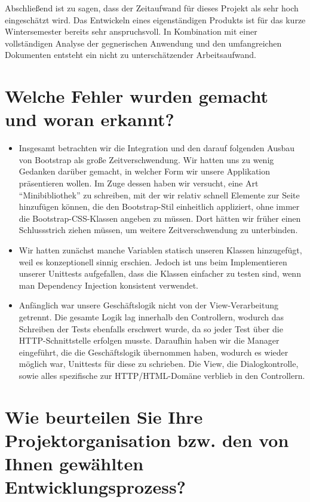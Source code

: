 \documentclass[12pt,DIV14,BCOR10mm,a4paper,parskip=half-,headsepline,headinclude,english,ngerman,bibliography=totocnumbered]{scrreprt}
\begin{document}
Abschließend ist zu sagen, dass der Zeitaufwand für dieses Projekt als sehr hoch eingeschätzt wird.
Das Entwickeln eines eigenständigen Produkts ist für das kurze Wintersemester bereits sehr anspruchsvoll. In Kombination mit einer vollständigen Analyse der gegnerischen Anwendung und den umfangreichen Dokumenten entsteht ein nicht zu unterschätzender Arbeitsaufwand.
\section{Welche Fehler wurden gemacht und woran erkannt?}

\begin{itemize}
  \item Insgesamt betrachten wir die Integration und den darauf folgenden Ausbau von Bootstrap als große Zeitverschwendung. Wir hatten uns zu wenig Gedanken darüber gemacht, in welcher Form wir unsere Applikation präsentieren wollen. Im Zuge dessen haben wir versucht, eine Art \enquote{Minibibliothek} zu schreiben, mit der wir relativ schnell Elemente zur Seite hinzufügen können, die den Bootstrap-Stil einheitlich appliziert, ohne immer die Bootstrap-CSS-Klassen angeben zu müssen. Dort hätten wir früher einen Schlussstrich ziehen müssen, um weitere Zeitverschwendung zu unterbinden.
  \item Wir hatten zunächst manche Variablen statisch unseren Klassen hinzugefügt, weil es konzeptionell sinnig erschien. Jedoch ist uns beim Implementieren unserer Unittests aufgefallen, dass die Klassen einfacher zu testen sind, wenn man Dependency Injection konsistent verwendet.
  \item Anfänglich war unsere Geschäftslogik nicht von der View-Verarbeitung getrennt. Die gesamte Logik lag innerhalb den Controllern, wodurch das Schreiben der Tests ebenfalls erschwert wurde, da so jeder Test über die HTTP-Schnittstelle erfolgen musste. Daraufhin haben wir die Manager eingeführt, die die Geschäftslogik übernommen haben, wodurch es wieder möglich war, Unittests für diese zu schrieben. Die View, die Dialogkontrolle, sowie alles spezifische zur HTTP/HTML-Domäne verblieb in den Controllern.
\end{itemize}

\section{Wie beurteilen Sie Ihre Projektorganisation bzw. den von Ihnen gewählten Entwicklungsprozess?}
\end{document}

